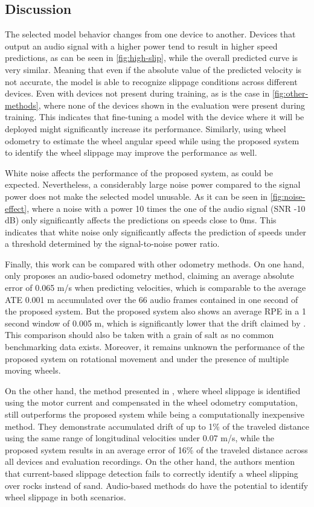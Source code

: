 \subsection{Discussion} \label{subsec:discussion}

The selected model behavior changes from one device to another. Devices that
output an audio signal with a higher power tend to result in higher speed
predictions, as can be seen in \cref{fig:high-slip}, while the overall
predicted curve is very similar. Meaning that even if the absolute value of the
predicted velocity is not accurate, the model is able to recognize slippage
conditions across different devices. Even with devices not present during
training, as is the case in \cref{fig:other-methods}, where none of the devices
shown in the evaluation were present during training. This indicates that
fine-tuning \cite{TL2016} a model with the device where it will be deployed
might significantly increase its performance. Similarly, using wheel odometry
to estimate the wheel angular speed while using the proposed system to identify
the wheel slippage may improve the performance as well.

White noise affects the performance of the proposed system, as could
be expected. Nevertheless, a considerably large noise power compared to the
signal power does not make the selected model unusable. As it can be seen in
\cref{fig:noise-effect}, where a noise with a power 10 times the one of the
audio signal (SNR -10 dB) only significantly affects the predictions on
speeds close to 0ms. This indicates that white noise only significantly affects
the prediction of speeds under a threshold determined by the signal-to-noise
power ratio.

Finally, this work can be compared with other odometry methods. On one hand,
only \cite{marchegiani2018a} proposes an audio-based odometry method, claiming
an average absolute error of 0.065 m/s when predicting velocities, which is
comparable to the average ATE 0.001 m accumulated over the 66 audio frames
contained in one second of the proposed system. But the proposed system also
shows an average RPE in a 1 second window of 0.005 m, which is significantly
lower that the drift claimed by \citeauthor{marchegiani2018a}. This comparison
should also be taken with a grain of salt as no common benchmarking data
exists. Moreover, it remains unknown the performance of the proposed system on
rotational movement and under the presence of multiple moving wheels.

On the other hand, the method presented in \cite{Ojeda2006}, where wheel
slippage is identified using the motor current and compensated in the wheel
odometry computation, still outperforms the proposed system while being a
computationally inexpensive method. They demonstrate accumulated drift of up to
1\% of the traveled distance using the same range of longitudinal velocities
under 0.07 m/s, while the proposed system results in an average error of
16\% of the traveled distance across all devices and evaluation recordings.
On the other hand, the authors mention that current-based slippage detection
fails to correctly identify a wheel slipping over rocks instead of sand.
Audio-based methods do have the potential to identify wheel slippage in both
scenarios.